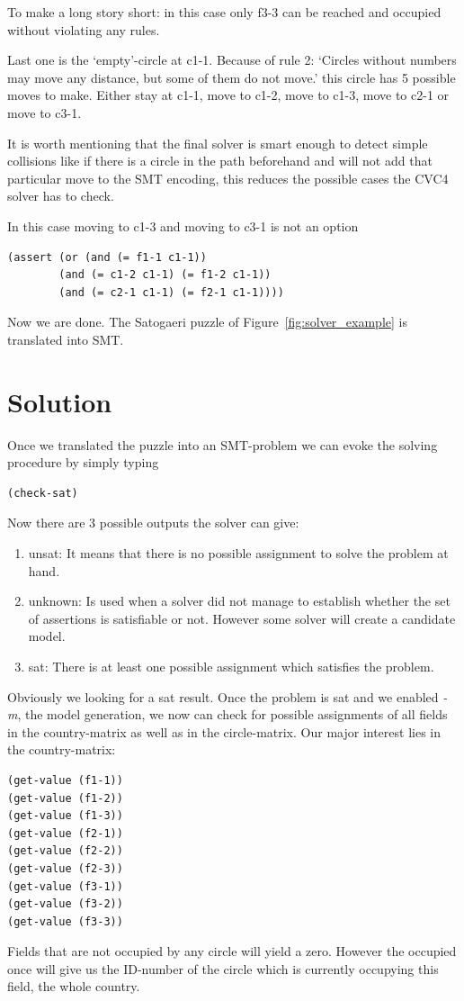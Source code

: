To make a long story short: in this case only f3-3 can be reached and occupied without violating any rules.

Last one is the `empty'-circle at c1-1. Because of rule 2: `Circles without numbers may move any distance, but some of them do not move.' this circle has 5 possible moves to make. Either stay at c1-1, move to c1-2, move to c1-3, move to c2-1 or move to c3-1. 

It is worth mentioning that the final solver is smart enough to detect simple collisions like if there is a circle in the path beforehand and will not add that particular move to the SMT encoding, this reduces the possible cases the CVC4 solver has to check.

In this case moving to c1-3 and moving to c3-1 is not an option
\begin{lstlisting}
(assert (or (and (= f1-1 c1-1)) 
	    (and (= c1-2 c1-1) (= f1-2 c1-1))
	    (and (= c2-1 c1-1) (= f2-1 c1-1))))
\end{lstlisting}
Now we are done. The Satogaeri puzzle of Figure~\ref{fig:solver_example} is translated into SMT.


\section{Solution}
Once we translated the puzzle into an SMT-problem we can evoke the solving procedure by simply typing
\begin{lstlisting}
(check-sat)
\end{lstlisting}
Now there are 3 possible outputs the solver can give:
\begin{enumerate}
  \item unsat: It means that there is no possible assignment to solve the problem at hand.
  \item unknown: Is used when a solver did not manage to establish whether the set of assertions is satisfiable or not. However some solver will create a candidate model.
  \item sat: There is at least one possible assignment which satisfies the problem.
\end{enumerate}
Obviously we looking for a sat result. Once the problem is sat and we enabled \emph{-m}, the model generation, we now can check for possible assignments of all fields in the country-matrix as well as in the circle-matrix. Our major interest lies in the country-matrix:
\begin{lstlisting}
(get-value (f1-1))
(get-value (f1-2))
(get-value (f1-3))
(get-value (f2-1))
(get-value (f2-2))
(get-value (f2-3))
(get-value (f3-1))
(get-value (f3-2))
(get-value (f3-3))
\end{lstlisting}
Fields that are not occupied by any circle will yield a zero. However the occupied once will give us the ID-number of the circle which is currently occupying this field, the whole country.

